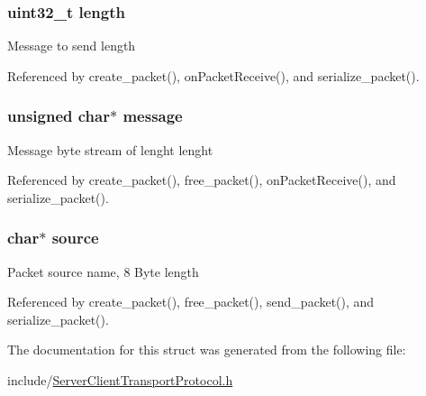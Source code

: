 \subsubsection[{\texorpdfstring{length}{length}}]{\setlength{\rightskip}{0pt plus 5cm}uint32\+\_\+t length}\hypertarget{structpacket__transport__t_aebb70c2aab3407a9f05334c47131a43b}{}\label{structpacket__transport__t_aebb70c2aab3407a9f05334c47131a43b}
Message to send length 

Referenced by create\+\_\+packet(), on\+Packet\+Receive(), and serialize\+\_\+packet().

\subsubsection[{\texorpdfstring{message}{message}}]{\setlength{\rightskip}{0pt plus 5cm}unsigned char$\ast$ message}\hypertarget{structpacket__transport__t_abb13456032cf48eaa794391b6ed937c7}{}\label{structpacket__transport__t_abb13456032cf48eaa794391b6ed937c7}
Message byte stream of lenght lenght 

Referenced by create\+\_\+packet(), free\+\_\+packet(), on\+Packet\+Receive(), and serialize\+\_\+packet().

\subsubsection[{\texorpdfstring{source}{source}}]{\setlength{\rightskip}{0pt plus 5cm}char$\ast$ source}\hypertarget{structpacket__transport__t_aee6937c81d468a0915308234d09d212c}{}\label{structpacket__transport__t_aee6937c81d468a0915308234d09d212c}
Packet source name, 8 Byte length 

Referenced by create\+\_\+packet(), free\+\_\+packet(), send\+\_\+packet(), and serialize\+\_\+packet().



The documentation for this struct was generated from the following file\+:\begin{DoxyCompactItemize}
\item 
include/\hyperlink{_server_client_transport_protocol_8h}{Server\+Client\+Transport\+Protocol.\+h}\end{DoxyCompactItemize}
